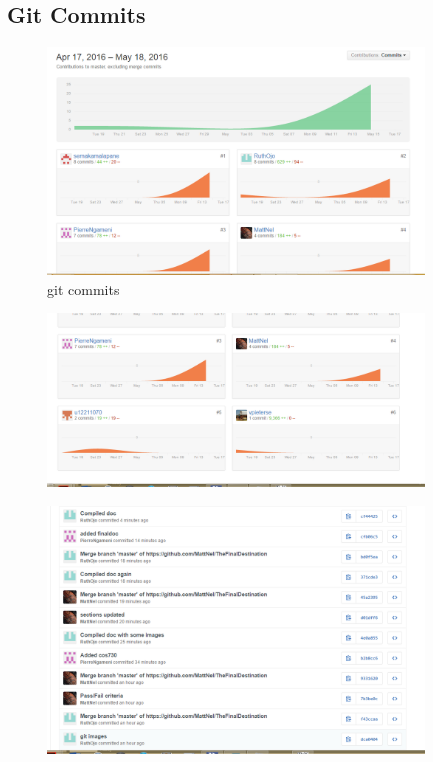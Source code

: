 \subsection{Git Commits}

\begin{figure}[H]
  		\centering
      	\includegraphics[width=100mm]{graphOne}	      	
  		\caption{git commits}
\end{figure}

\begin{figure}[H]
  		\centering
      	\includegraphics[width=100mm]{graphTwo}	      	
  		\caption{}
\end{figure}

\begin{figure}[H]
  		\centering
      	\includegraphics[width=100mm]{gitFour}	      	
  		\caption{}
\end{figure}


